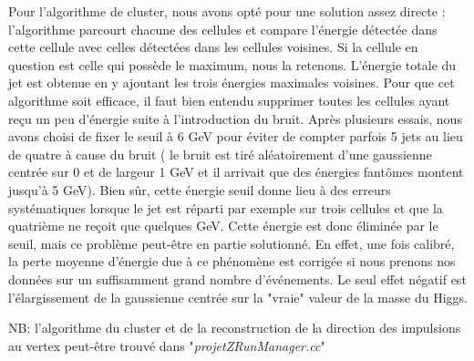 \documentclass[11pt]{article}
\begin{document}
Pour l'algorithme de cluster, nous avons opté pour une solution assez directe :
l'algorithme parcourt chacune des cellules et compare l'énergie
détectée dans cette cellule avec celles détectées dans les cellules voisines.
Si la cellule en question est celle qui possède le maximum, nous la retenons.
L'énergie totale du jet est obtenue en y ajoutant les trois énergies
maximales voisines. Pour que cet algorithme soit efficace, il faut bien entendu
supprimer toutes les cellules ayant reçu un peu d'énergie suite à
l'introduction du bruit. Après
plusieurs essais, nous avons choisi de fixer le seuil à 6 GeV pour éviter de
compter parfois 5 jets au lieu de quatre à cause du bruit ( le bruit est tiré
aléatoirement d'une gaussienne centrée sur 0 et de largeur 1 GeV et il arrivait
que des énergies fantômes montent jusqu'à 5 GeV). Bien sûr, cette énergie seuil
donne lieu à des erreurs systématiques lorsque le jet est réparti par exemple
sur trois cellules et que la quatrième ne reçoit que quelques GeV. Cette
énergie est donc éliminée par le seuil, mais ce problème peut-être en partie
solutionné. En effet, une fois calibré, la perte moyenne d'énergie due à ce
phénomène est corrigée si nous prenons nos données sur un suffisamment grand
nombre d'événements. Le seul effet négatif est l'élargissement de la gaussienne
centrée sur la "vraie" valeur de la masse du Higgs.

NB: l'algorithme du cluster et de la reconstruction de la direction des
impulsions au vertex peut-être trouvé dans "\textit{projetZRunManager.cc}"
\end{document}
